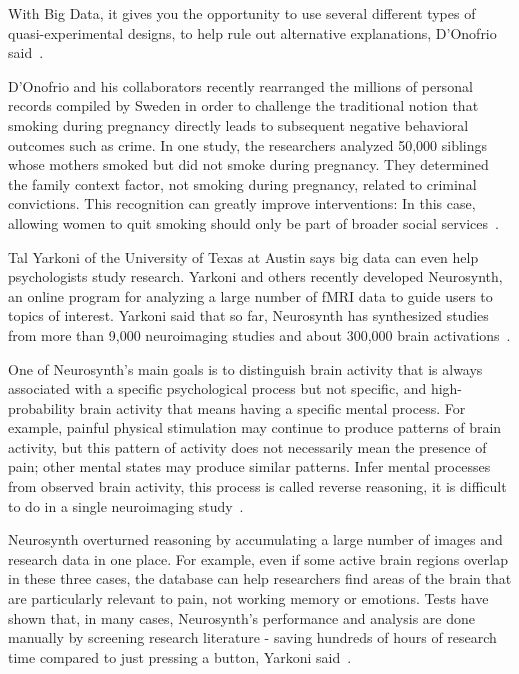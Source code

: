 With Big Data, it gives you the opportunity to use several different 
types of quasi-experimental designs, to help rule out alternative 
explanations, D’Onofrio said~\cite{editor00}.

D'Onofrio and his collaborators recently rearranged the millions of 
personal records compiled by Sweden in order to challenge the traditional 
notion that smoking during pregnancy directly leads to subsequent negative 
behavioral outcomes such as crime. In one study, the researchers analyzed 
50,000 siblings whose mothers smoked but did not smoke during pregnancy. 
They determined the family context factor, not smoking during pregnancy, 
related to criminal convictions. This recognition can greatly improve 
interventions: 
In this case, allowing women to quit smoking should only be part of 
broader social services~\cite{editor00}.

Tal Yarkoni of the University of Texas at Austin says big data can 
even help psychologists study research. Yarkoni and others recently 
developed Neurosynth, an online program for analyzing a large number 
of fMRI data to guide users to topics of interest. Yarkoni said that 
so far, Neurosynth has synthesized studies from more than 9,000 
neuroimaging studies and about 300,000 brain activations~\cite{editor00}.

One of Neurosynth's main goals is to distinguish brain activity that 
is always associated with a specific psychological process but not 
specific, and high-probability brain activity that means having a 
specific mental process. For example, painful physical stimulation 
may continue to produce patterns of brain activity, but this pattern 
of activity does not necessarily mean the presence of pain; other 
mental states may produce similar patterns. Infer mental processes 
from observed brain activity, this process is called reverse 
reasoning, it is difficult to do in a single neuroimaging study~\cite{editor00}.

Neurosynth overturned reasoning by accumulating a large number of 
images and research data in one place. For example, even if some 
active brain regions overlap in these three cases, the database can 
help researchers find areas of the brain that are particularly relevant 
to pain, not working memory or emotions. Tests have shown that, in many 
cases, Neurosynth's performance and analysis are done manually by 
screening research literature - saving hundreds of hours of research 
time compared to just pressing a button, Yarkoni said~\cite{editor00}.

